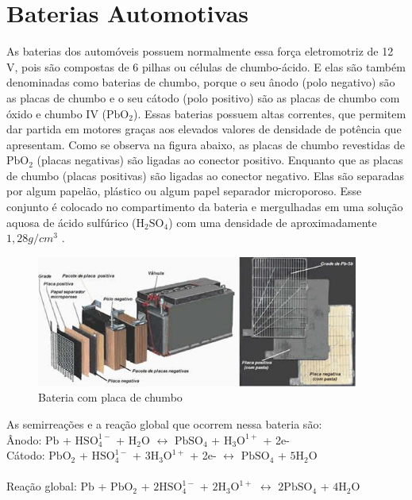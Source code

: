 \chapter[Baterias]{Baterias Automotivas}

As baterias dos automóveis possuem normalmente essa força eletromotriz de 12 V, pois são compostas de 6 pilhas ou células de chumbo-ácido. E elas são também denominadas como baterias de chumbo, porque o seu ânodo (polo negativo) são as placas de chumbo e o seu cátodo (polo positivo) são as placas de chumbo com óxido e chumbo IV ($\mathrm{Pb O_2}$).
Essas baterias possuem altas correntes, que permitem dar partida em motores graças aos elevados valores de densidade de potência que apresentam.
Como se observa na figura abaixo, as placas de chumbo revestidas de $\mathrm{Pb O_2}$ (placas negativas) são ligadas ao conector positivo. Enquanto que as placas de chumbo (placas positivas) são ligadas ao conector negativo. Elas são separadas por algum papelão, plástico ou algum papel separador microporoso.
Esse conjunto é colocado no compartimento da bateria e mergulhadas em uma solução aquosa de ácido sulfúrico ($\mathrm{H_2 SO_4}$) com uma densidade de aproximadamente $1,28 g/cm^{3}$	.

\begin{figure}[h]
  \centering
  \includegraphics[width=400px, scale=1]{figuras/bateria}
  \caption{Bateria com placa de chumbo}
\end{figure}

As semirreações e a reação global que ocorrem nessa bateria são:\\
Ânodo: $\mathrm{Pb}$ + $\mathrm{HSO_4^{1-}}$ + $\mathrm{H_2 O}$ $\leftrightarrow$ $\mathrm{PbSO_4}$ + $\mathrm{H_3 O^{1+}}$ + 2e-\\
Cátodo: $\mathrm{Pb O_2}$ + $\mathrm{HSO_4^{1-}}$ + $\mathrm{3 H_3 O^{1+}}$ + 2e- $\leftrightarrow$ $\mathrm{PbSO_4}$ + $\mathrm{5 H_2 O}$\\
\dotfill\\
Reação global: $\mathrm{Pb}$ + $\mathrm{PbO_2}$ + $\mathrm{2HSO_4^{1-}}$ + $\mathrm{2H_3 O^{1+}}$ $\leftrightarrow$ $\mathrm{2PbSO_4}$ + $\mathrm{4 H_2 O}$


